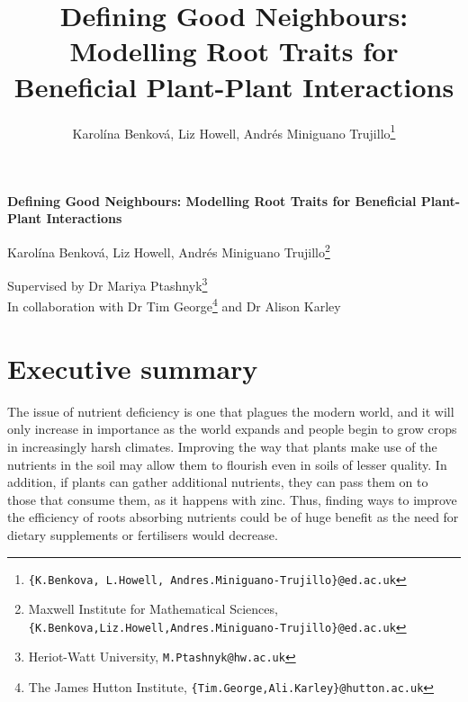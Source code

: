 \documentclass[11pt]{article}
\title{\bf
    \Large
    Defining Good Neighbours: Modelling Root Traits for Beneficial Plant-Plant Interactions
}
\author{
    Karolína Benková, Liz Howell, Andrés Miniguano Trujillo\footnote{ \texttt{\{K.Benkova, L.Howell, Andres.Miniguano-Trujillo\}@ed.ac.uk} }
}
\date{}
\numberwithin{equation}{section}
\begin{document}
\begin{titlepage}
    \begin{center}
        \vspace*{2cm}
        
        \Huge
        \textbf{Defining Good Neighbours: Modelling Root Traits for Beneficial Plant-Plant Interactions}
        
            
        \vspace{1cm}
        
        \Large Karolína Benková, Liz Howell, Andrés Miniguano Trujillo\footnote{\normalsize Maxwell Institute for Mathematical Sciences,   \texttt{\{K.Benkova,Liz.Howell,Andres.Miniguano-Trujillo\}@ed.ac.uk}}
        
            
        \vspace{1.5cm}
            
        \Large
        Supervised by Dr Mariya Ptashnyk\footnote{\normalsize Heriot-Watt University, \texttt{M.Ptashnyk@hw.ac.uk}} \\ 
        In collaboration with Dr Tim George\footnote{\normalsize The James Hutton Institute, \texttt{\{Tim.George,Ali.Karley\}@hutton.ac.uk}} and Dr Alison Karley\textsuperscript{\small\ddag}

        \vfill
            
        
    \end{center}
\end{titlepage}
\newpage
{}

\section*{Executive summary}
\singlespacing

The issue of nutrient deficiency is one that plagues the modern world, and it will only increase in importance as the world expands and people begin to grow crops in increasingly harsh climates. 
Improving the way that plants make use of the nutrients in the soil may allow them to flourish even in soils of lesser quality. In addition, if plants can gather additional nutrients, they can pass them on to those that consume them, as it happens with zinc. Thus, finding ways to improve the efficiency of roots absorbing nutrients could be of huge benefit as the need for dietary supplements or fertilisers would decrease.
\end{document}
